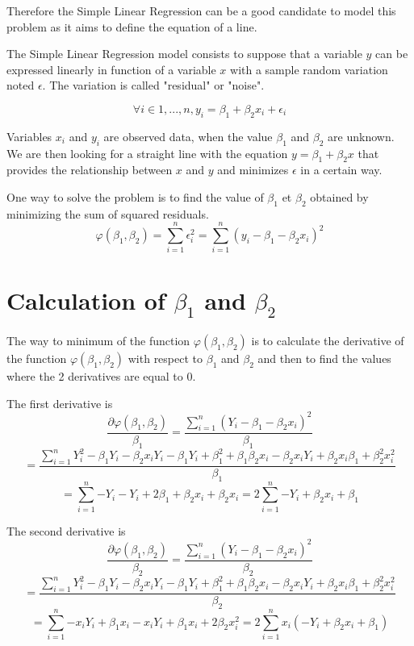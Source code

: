 \documentclass[
	12pt, %
]{article}
\theoremstyle{definition}
\begin{document}
Therefore the Simple Linear Regression can be a good candidate to model this problem as it aims to define the equation of a line. 


The Simple Linear Regression model consists to suppose that a variable $y$ can be expressed linearly in function of a variable $x$ with a sample random variation noted $\epsilon$. The variation is called "residual" or "noise". 

$$
\forall i \in {1, . . . , n}, y_i = \beta_1 + \beta_2x_i + \epsilon_i
$$

Variables $x_i$ and $y_i$ are observed data, when the value $\beta_1$ and $\beta_2$ are unknown.
We are then looking for a straight line with the equation $y = \beta_1 + \beta_2x$ that provides the relationship between $x$ and $y$ and minimizes $\epsilon$ in a certain way.

One way to solve the problem is to find the value of $\beta_1$ et $\beta_2$ obtained by minimizing the sum of squared residuals.
$$
\varphi(\beta_1, \beta_2) = \sum_{i=1}^{n}{\epsilon_i^2} = \sum_{i=1}^{n}{(y_i - \beta_1 - \beta_2x_i)^2}
$$

\section{Calculation of $\beta_1$ and $\beta_2$}
The way to minimum of the function $\varphi(\beta_1, \beta_2)$ is to calculate the derivative of the function $\varphi(\beta_1, \beta_2)$ with respect to $\beta_1$ and $\beta_2$ and then to find the values where the 2 derivatives are equal to 0.

\bigskip
The first derivative is
$$
\frac{\partial \varphi(\beta_1, \beta_2)}{\beta_1} = \frac{\sum_{i=1}^{n}{(Y_i - \beta_1 - \beta_2x_i)^2}}{\beta_1} 
$$
$$
= \frac{\sum_{i=1}^{n}{Y_i^2 - \beta_1Y_i - \beta_2x_iY_i -\beta_1Y_i + \beta_1^2 + \beta_1\beta_2x_i - \beta_2x_iY_i + \beta_2x_i\beta_1 +\beta_2^2x_i^2}}{\beta_1}
$$
$$
= \sum_{i=1}^{n}{-Y_i -Y_i +2\beta_1 +\beta_2x_i+\beta_2x_i} = 2 \sum_{i=1}^{n}{-Y_i+\beta_2x_i+\beta_1}
$$

\bigskip
The second derivative is
$$
\frac{\partial \varphi(\beta_1, \beta_2)}{\beta_2} = \frac{\sum_{i=1}^{n}{(Y_i - \beta_1 - \beta_2x_i)^2}}{\beta_2}
$$
$$
= \frac{\sum_{i=1}^{n}{Y_i^2 - \beta_1Y_i - \beta_2x_iY_i -\beta_1Y_i + \beta_1^2 + \beta_1\beta_2x_i - \beta_2x_iY_i + \beta_2x_i\beta_1 +\beta_2^2x_i^2}}{\beta_2}
$$
$$
= \sum_{i=1}^{n}{-x_iY_i+\beta_1x_i-x_iY_i + \beta_1x_i+2\beta_2x_i^2} = 2 \sum_{i=1}^{n}{x_i(-Y_i+\beta_2x_i+\beta_1)}
$$
\end{document}
